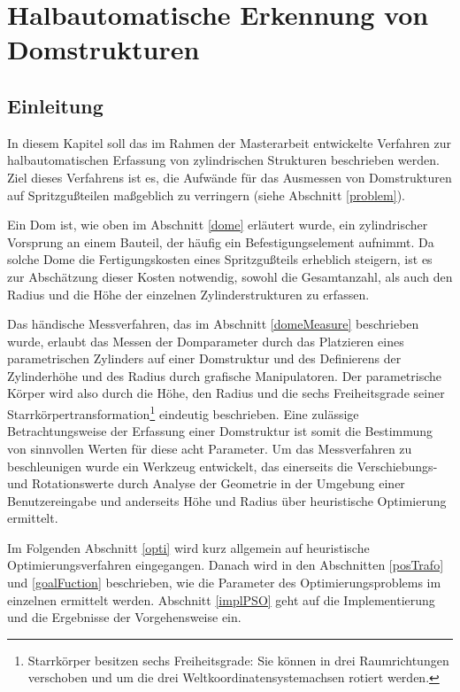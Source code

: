 \chapter{Halbautomatische Erkennung von Domstrukturen}
\label{cha:psoDomes}	
	

\section{Einleitung}

In diesem Kapitel soll das im Rahmen der Masterarbeit entwickelte Verfahren zur halbautomatischen Erfassung 
von zylindrischen Strukturen beschrieben werden. Ziel dieses Verfahrens ist es, die Aufw\"ande f\"ur das Ausmessen von Domstrukturen auf Spritzgu{\ss}teilen ma{\ss}geblich zu verringern (siehe Abschnitt \ref{problem}). 

Ein Dom ist, wie oben im Abschnitt \ref{dome} erl\"autert wurde, ein zylindrischer Vorsprung an einem Bauteil, der h\"aufig ein Befestigungselement aufnimmt. Da solche Dome die Fertigungskosten eines Spritzgu{\ss}teils erheblich steigern, ist es zur Absch\"atzung dieser Kosten notwendig, sowohl die Gesamtanzahl, als auch den Radius und die H\"ohe der einzelnen Zylinderstrukturen zu erfassen.

Das h\"andische Messverfahren, das im Abschnitt \ref{domeMeasure} beschrieben wurde, erlaubt das Messen der Domparameter durch das Platzieren eines parametrischen Zylinders auf einer Domstruktur und des Definierens der Zylinderh\"ohe und des Radius durch grafische Manipulatoren. 
Der parametrische K\"orper wird also durch die H\"ohe, den Radius und die sechs Freiheitsgrade seiner Starrk\"orpertransformation\footnote{Starrkörper besitzen sechs Freiheitsgrade: Sie können in drei Raumrichtungen
verschoben und um die drei Weltkoordinatensystemachsen rotiert werden.} eindeutig beschrieben. Eine zul\"assige Betrachtungsweise der Erfassung einer Domstruktur ist somit die Bestimmung von sinnvollen Werten für diese acht Parameter. Um das Messverfahren zu beschleunigen wurde ein Werkzeug entwickelt, das einerseits die Verschiebungs- und
Rotationswerte durch Analyse der Geometrie in der Umgebung einer Benutzereingabe und anderseits H\"ohe und Radius über heuristische Optimierung ermittelt.

Im Folgenden Abschnitt \ref{opti} wird kurz allgemein auf heuristische Optimierungsverfahren eingegangen. Danach wird in den Abschnitten  \ref{posTrafo} und \ref{goalFuction} beschrieben, wie die Parameter des Optimierungsproblems im einzelnen ermittelt werden. Abschnitt \ref{implPSO} geht auf die Implementierung und die Ergebnisse der Vorgehensweise ein.


